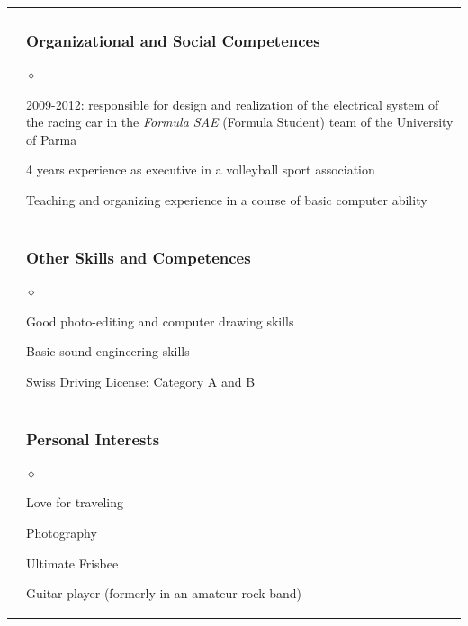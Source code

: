 \documentclass[a4paper]{article}
\newlength{\sectsep}
\newlength{\subsectsep}
\renewenvironment{itemize}{
  \begin{list}{$\diamond$}{
    \setlength{\topsep}{0.25em}
    \setlength{\itemsep}{0em}
    \setlength{\parskip}{0pt}
    \setlength{\parsep}{0em}
  }
}{
  \end{list}
}
\begin{document}
\begin{longtable}{r || l}
  & \begin{minipage}{0.9\textwidth}
      \vspace{\subsectsep}
      \subsubsection*{Organizational and Social Competences}
      \begin{itemize}
          \item 2009-2012: responsible for design and realization of the electrical system of the racing car in the \emph{Formula SAE} (Formula Student) team of the University of Parma
          \item 4 years experience as executive in a volleyball sport association
          \item Teaching and organizing experience in a course of basic computer ability
      \end{itemize}
  \end{minipage} \\[\sectsep]

  & \begin{minipage}{0.9\textwidth}
      \vspace{\subsectsep}
      \subsubsection*{Other Skills and Competences}
      \begin{itemize}
          \item Good photo-editing and computer drawing skills
          \item Basic sound engineering skills
          \item Swiss Driving License: Category A and B
      \end{itemize}
  \end{minipage} \\[\sectsep]

  & \begin{minipage}{0.9\textwidth}
      \vspace{\subsectsep}
      \subsubsection*{Personal Interests}
      \begin{itemize}
          \item Love for traveling
          \item Photography
          \item Ultimate Frisbee
          \item Guitar player (formerly in an amateur rock band)
      \end{itemize}
  \end{minipage} \\[\sectsep]


\end{longtable}
\end{document}
